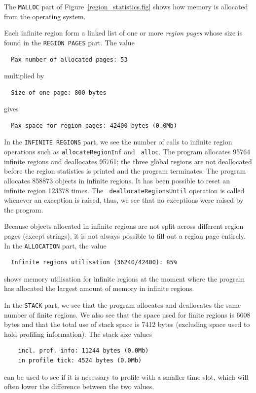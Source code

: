 \documentclass[12pt]{book}
\begin{document}
The {\tt MALLOC} part of Figure~\ref{region_statistics.fig} shows how
memory is allocated from the operating system.

Each infinite region form a linked list of one or more
% 
{\em region pages\/} whose size is found in the {\tt REGION PAGES}
part. The value
\begin{verbatim}
  Max number of allocated pages: 53
\end{verbatim}
multiplied by
\begin{verbatim}
  Size of one page: 800 bytes
\end{verbatim}
gives 
\begin{verbatim}
  Max space for region pages: 42400 bytes (0.0Mb)
\end{verbatim}

In the {\tt INFINITE REGIONS} part, we see the number of calls to
infinite region operations such as {\tt allocateRegionInf} and {\tt
  alloc}. The program allocates 95764 infinite regions and
deallocates 95761; the three global regions are not deallocated
before the region statistics is printed and the program terminates.
The program allocates 858873 objects in infinite regions. It has
been possible to reset an infinite region 123378 times. The {\tt
  deallocateRegionsUntil} operation is called whenever an exception is
raised, thus, we see that no exceptions were raised by the program.

Because objects allocated in infinite regions are not split across
different region pages (except strings), it is not always possible to
fill out a region page entirely. In the {\tt ALLOCATION} part, the value
\begin{verbatim}
  Infinite regions utilisation (36240/42400): 85%
\end{verbatim}
shows memory utilisation for infinite regions at the moment where the
program has allocated the largest amount of memory in infinite
regions.

In the {\tt STACK} part, we see that the program allocates and
deallocates the same number of finite regions. We also see that the
space used for finite regions is 6608 bytes and that the total use of
stack space is 7412 bytes (excluding space used to hold profiling
information). The stack size values
\begin{verbatim}
    incl. prof. info: 11244 bytes (0.0Mb)
    in profile tick: 4524 bytes (0.0Mb)
\end{verbatim}
can be used to see if it is necessary to profile with a smaller time
slot, which will often lower the difference between the two values.
\end{document}
